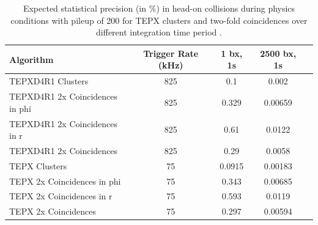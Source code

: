 \begin{table}[htbp]
\centering
\caption[Expected stat. precision of TEPX under high pileup]{Expected statistical precision (in $\%$) in head-on collisions during physics conditions with pileup of 200 for TEPX clusters and two-fold coincidences over different integration time period \cite{Collaboration:2759074}.}
\begin{small} %
\begin{tabular}{lcccc}
Algorithm & Trigger Rate (kHz) & 1 bx, 1s & 2500 bx, 1s\\
\hline
TEPXD4R1 Clusters & 825 & 0.1 & 0.002  \\
TEPXD4R1 2x Coincidences in phi & 825 & 0.329 & 0.00659 \\
TEPXD4R1 2x Coincidences in r & 825 & 0.61 & 0.0122  \\
TEPXD4R1 2x Coincidences & 825 & 0.29 & 0.0058  \\
TEPX Clusters & 75 & 0.0915 & 0.00183  \\
TEPX 2x Coincidences in phi & 75 & 0.343 & 0.00685 \\
TEPX 2x Coincidences in r & 75 & 0.593 & 0.0119  \\
TEPX 2x Coincidences & 75 & 0.297 & 0.00594  \\
\end{tabular}
\end{small}
\end{table}


